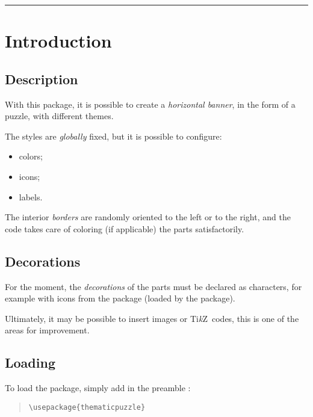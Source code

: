 \documentclass[11pt,a4paper]{ltxdoc}
\providecommand\tikzlogo{Ti\textit{k}Z}
\let\TikZ\tikzlogo
\begin{document}
\hypertarget{matoc}{}

\tableofcontents

\vspace*{5mm}

\hrule

\vspace*{5mm}

\section{Introduction}

\subsection{Description}

With this package, it is possible to create a \textit{horizontal banner}, in the form of a puzzle, with different themes.

The styles are \textit{globally} fixed, but it is possible to configure:

\begin{itemize}
	\item colors;
	\item icons;
	\item labels.
\end{itemize}

The interior \textit{borders} are randomly oriented to the left or to the right, and the code takes care of coloring (if applicable) the parts satisfactorily.

\subsection{Decorations}

For the moment, the \textit{decorations} of the parts must be declared as characters, for example with icons from the  package (loaded by the package).

\smallskip

Ultimately, it may be possible to insert images or \TikZ\ codes, this is one of the areas for improvement.

\subsection{Loading}

To load the package, simply add in the preamble :

\begin{quote}
\begin{verbatim}
\usepackage{thematicpuzzle}
\end{verbatim}
\end{quote}
\end{document}

